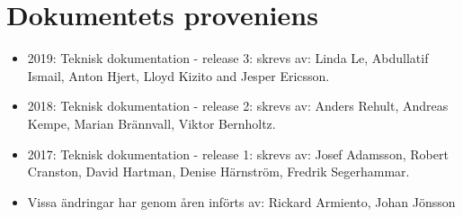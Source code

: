 \section{Dokumentets proveniens}
\label{sec:provenance}

\begin{itemize}
\item 2019: Teknisk dokumentation - release 3: skrevs av: Linda Le, Abdullatif Ismail, Anton Hjert, Lloyd Kizito and Jesper Ericsson.
\item 2018: Teknisk dokumentation - release 2: skrevs av: Anders Rehult, Andreas Kempe, Marian Brännvall, Viktor Bernholtz.
\item 2017: Teknisk dokumentation - release 1: skrevs av: Josef Adamsson, Robert Cranston, David Hartman, Denise Härnström, Fredrik Segerhammar.
\item Vissa ändringar har genom åren införts av: Rickard Armiento, Johan Jönsson
\end{itemize}
